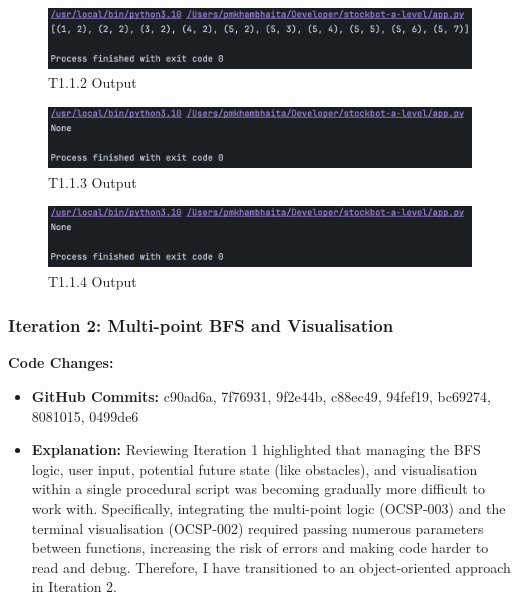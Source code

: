 \begin{figure}[htbp!]
    \centering
    \includegraphics[width=1\linewidth]{Images/t1.2.png}
    \caption{T1.1.2 Output}
    \label{fig:enter-label}
\end{figure}

\begin{figure}[htbp!]
    \centering
    \includegraphics[width=1\linewidth]{Images/t1.3,1.4.png}
    \caption{T1.1.3 Output}
    \label{fig:enter-label}
\end{figure}

\begin{figure}[htbp!]
    \centering
    \includegraphics[width=1\linewidth]{Images/t1.3,1.4.png}
    \caption{T1.1.4 Output}
    \label{fig:enter-label}
\end{figure}


\newpage

\subsubsection{Iteration 2: Multi-point BFS and Visualisation}

\textbf{Code Changes:}
\begin{itemize}
    \item \textbf{GitHub Commits:} c90ad6a, 7f76931, 9f2e44b, c88ec49, 94fef19, bc69274, 8081015, 0499de6
    \item \textbf{Explanation:}
    Reviewing Iteration 1 highlighted that managing the BFS logic, user input, potential future state (like obstacles), and visualisation within a single procedural script was becoming gradually more difficult to work with. Specifically, integrating the multi-point logic (OCSP-003) and the terminal visualisation (OCSP-002) required passing numerous parameters between functions, increasing the risk of errors and making code harder to read and debug. Therefore, I have transitioned to an object-oriented approach in Iteration 2.
\end{itemize}


